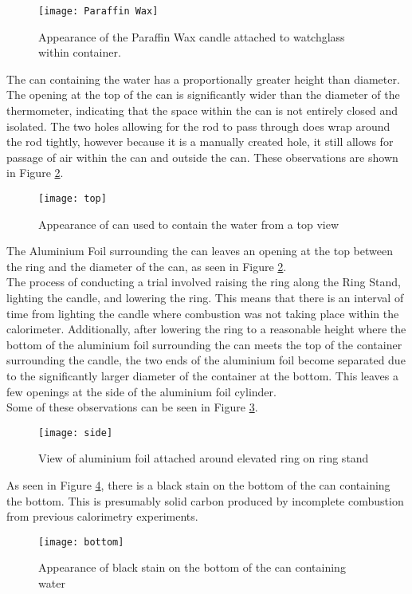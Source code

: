 \documentclass[
	letterpaper, %
	12pt, %
]{CSUniSchoolLabReport}
\begin{document}
\begin{figure}[H] %
  \centering %
  \texttt{[image: Paraffin Wax]} %
  \caption{Appearance of the Paraffin Wax candle attached to watchglass within container.}
  \label{fig:paraffin}
\end{figure}

The can containing the water has a proportionally greater height than diameter.
The opening at the top of the can is significantly wider than the diameter of the thermometer,
indicating that the space within the can is not entirely closed and isolated.
The two holes allowing for the rod to pass through does wrap around the rod
tightly, however because it is a manually created hole, it still allows for passage
of air within the can and outside the can. These observations are shown in
Figure \ref*{fig:cantop}.
\begin{figure}[H]
  \centering
  \texttt{[image: top]}
  \caption{Appearance of can used to contain the water from a top view}
  \label{fig:cantop}
\end{figure}

The Aluminium Foil surrounding the can leaves an opening at the top between
the ring and the diameter of the can, as seen in Figure \ref*{fig:cantop}.
\\
The process of conducting a trial involved raising the ring along the Ring Stand,
lighting the candle, and lowering the ring. This means that there is an interval of time
from lighting the candle where combustion was not taking place within the calorimeter.
Additionally, after lowering the ring to a reasonable height where the bottom of the
aluminium foil surrounding the can meets the top of the container surrounding the
candle, the two ends of the aluminium foil become separated due to the significantly
larger diameter of the container at the bottom. This leaves a few openings at the side
of the aluminium foil cylinder.
\\
Some of these observations can be seen in Figure \ref*{fig:canside}.
\begin{figure}[H]
  \centering
  \texttt{[image: side]}
  \caption{View of aluminium foil attached around elevated ring on ring stand}
  \label{fig:canside}
\end{figure}

As seen in Figure \ref*{fig:canbottom}, there is a black stain on the bottom of the can
containing the bottom. This is presumably solid carbon produced by incomplete combustion
from previous calorimetry experiments.
\begin{figure}[H]
  \centering
  \texttt{[image: bottom]}
  \caption{Appearance of black stain on the bottom of the can containing water}
  \label{fig:canbottom}
\end{figure}
\end{document}
